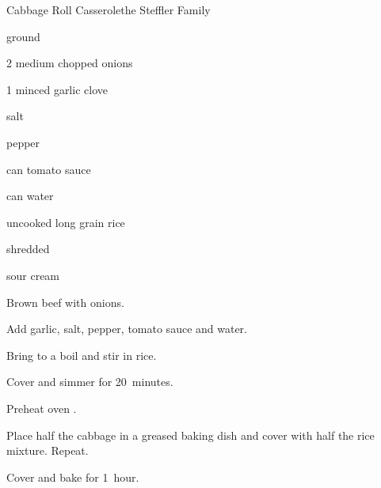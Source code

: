 \begin{recipe}{Cabbage Roll Casserole}{the Steffler Family}{}

\begin{ingredients}
\item \lbs{1\half} ground 
\item 2 medium chopped onions
\item 1 minced garlic clove
\item {} salt
\item \tp{\quarter} pepper
\item {} can tomato sauce
\item {} can water
\item \C{\half} uncooked long grain rice
\item {} shredded 
\item sour cream
\end{ingredients}

\begin{directions}
\item Brown beef with onions.
\item Add garlic, salt, pepper, tomato sauce and water.
\item Bring to a boil and stir in rice.
\item Cover and simmer for 20~minutes.
\item Preheat oven .
\item Place half the cabbage in a greased baking dish and cover with half the rice mixture. Repeat.
\item Cover and bake for 1~hour.
\end{directions}

\end{recipe}
